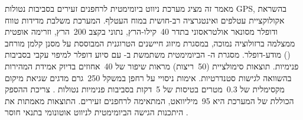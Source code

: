 


מאמר זה מציג מערכת ניווט ביומימטית לרחפנים זעירים בסביבות נטולות GPS, בהשראת אקולוקציית עטלפים ואינטגרציה רב-חושית במוח העטלף. המערכת משלבת מדידות טווח ודופלר מסונאר אולטראסוני בתדר 40~קילו-הרץ, נתוני  בקצב 200~הרץ, וזרימה אופטית ממצלמה ברזולוציה נמוכה, במסגרת מיזוג חיישנים הטרוגנית המבוססת על מסנן קלמן מורחב () מודע-דופלר. מסגרת ה- הביומימטית משתמשת ב- עם סיוע דופלר למיפוי עקבי בסביבות פנימיות. תוצאות סימולציית  (50~ריצות) מראות שיפור של 40~אחוזים בדיוק אמידת המהירות בהשוואה לגישות  סטנדרטיות. אימות ניסויי על רחפן  במשקל 250~גרם מדגים שגיאת מיקום מקסימלית של 0.3~מטרים בטיסות של 5~דקות בסביבות פנימיות נטולות . צריכת ההספק הכוללת של המערכת היא 95~מיליוואט, המתאימה לרחפנים זעירים. התוצאות מאמתות את היתכנות הגישה הביומימטית לניווט אוטונומי בתנאי חוסר .

